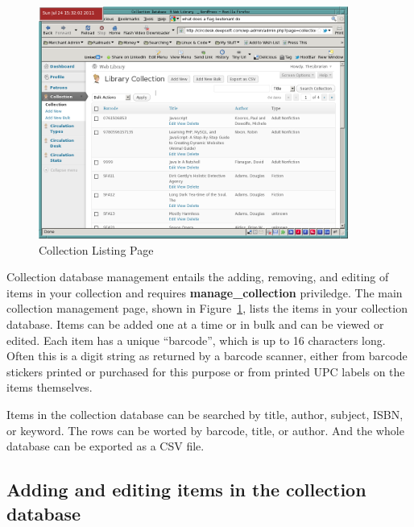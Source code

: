 \documentclass[letterpaper,twoside]{article}
\begin{document}
\begin{figure}[htbp]
\begin{centering}
\includegraphics[width=4in]{ColectionListing.png}
\caption{Collection Listing Page}
\label{fig:CollectionList}
\end{centering}
\end{figure}
Collection database management entails the adding, removing, and
editing of items in your collection and requires
\textbf{manage\_collection} priviledge.  The main collection management
page, shown in Figure~\ref{fig:CollectionList}, lists the items in your
collection database. Items can be added one at a time or in bulk and
can be viewed or edited.  Each item has a unique ``barcode'', which is
up to 16 characters long.  Often this is a digit string as returned by
a barcode scanner, either from barcode stickers printed or purchased
for this purpose or from printed UPC labels on the items themselves.

Items in the collection database can be searched by title, author,
subject, ISBN, or keyword.  The rows can be worted by barcode, title, or
author. And the whole database can be exported as a CSV file.

\subsection{Adding and editing items in the collection database}
\end{document}
